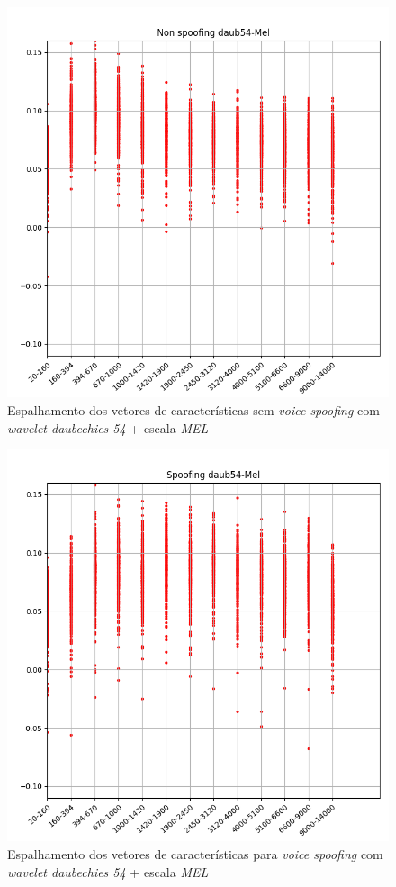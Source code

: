 		\begin{figure}
			\centering
			\includegraphics[width=\linewidth]{images/results/barkVersusMel/liveDaub54Mel}
			\caption{Espalhamento dos vetores de características sem \textit{voice spoofing} com \textit{wavelet daubechies 54} + escala \textit{MEL} }
			\label{fig:livedaub54mel}
		\end{figure}
		\begin{figure}
			\centering
			\includegraphics[width=\linewidth]{images/results/barkVersusMel/spoofingDaub54Mel}
			\caption{Espalhamento dos vetores de características para \textit{voice spoofing} com \textit{wavelet daubechies 54} + escala \textit{MEL} }
			\label{fig:spoofingdaub54mel}
		\end{figure}